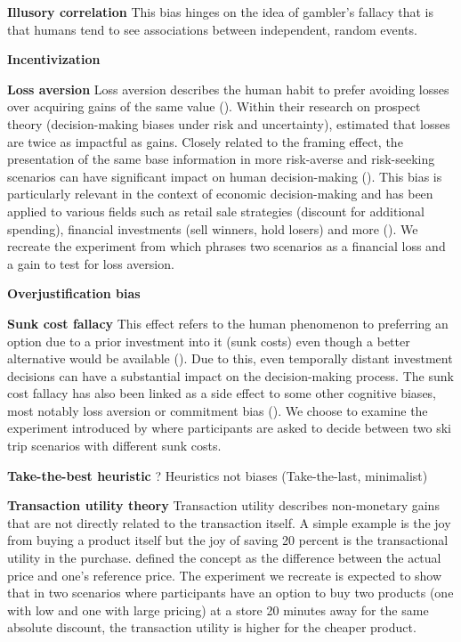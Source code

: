 \par \textbf{Illusory correlation} This bias hinges on the idea of gambler's fallacy that is that humans tend to see associations between independent, random events.

\par \textbf{Incentivization} 

\par \textbf{Loss aversion} Loss aversion describes the human habit to prefer avoiding losses over acquiring gains of the same value  (\cite{liu2023review}). Within their research on prospect theory (decision-making biases under risk and uncertainty), \cite{tversky1992advances} estimated that losses are twice as impactful as gains. Closely related to the framing effect, the presentation of the same base information in more risk-averse and risk-seeking scenarios can have significant impact on human decision-making (\cite{druckman2001evaluating}). This bias is particularly relevant in the context of economic decision-making and has been applied to various fields such as retail sale strategies (discount for additional spending), financial investments (sell winners, hold losers) and more (\cite{liu2023review}). We recreate the experiment from \cite{thaler2015misbehaving} which phrases two scenarios as a financial loss and a gain to test for loss aversion.

\par \textbf{Overjustification bias} 

\par \textbf{Sunk cost fallacy} This effect refers to the human phenomenon to preferring an option due to a prior investment into it (sunk costs) even though a better alternative would be available (\cite{arkes1985psychology}). Due to this, even temporally distant investment decisions can have a substantial impact on the decision-making process. The sunk cost fallacy has also been linked as a side effect to some other cognitive biases, most notably loss aversion or commitment bias (\cite{jarmolowicz2016sunk}). We choose to examine the experiment introduced by \cite{arkes1985psychology} where participants are asked to decide between two ski trip scenarios with different sunk costs.

\par \textbf{Take-the-best heuristic} ? Heuristics not biases (Take-the-last, minimalist)

\par \textbf{Transaction utility theory} Transaction utility describes non-monetary gains that are not directly related to the transaction itself. A simple example is the joy from buying a product itself but the joy of saving 20 percent is the transactional utility in the purchase. \cite{thaler1983transaction} defined the concept as the difference between the actual price and one's reference price. The experiment we recreate is expected to show that in two scenarios where participants have an option to buy two products (one with low and one with large pricing) at a store 20 minutes away for the same absolute discount, the transaction utility is higher for the cheaper product.

